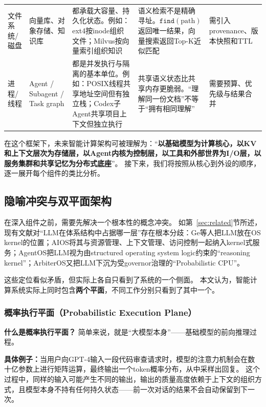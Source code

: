 \begin{table}[t]
\begin{tabularx}{\textwidth}{p{}p{}Y Y Y}
文件系统/磁盘 & 向量库、对象存储、知识库 & 都承载大容量、持久化状态。例如：ext4按inode组织文件；Milvus按向量索引组织知识\cite{lewis2020rag} & 语义检索不是精确寻址。$\texttt{find}(\text{path})$返回唯一结果，向量搜索返回Top-K近似匹配 & 需引入provenance、版本快照和TTL \\
进程/线程 & Agent / Subagent / Task graph & 都是并发执行与隔离的基本单位。例如：POSIX线程共享地址空间但有独立栈；Codex子Agent共享项目上下文但独立执行\cite{openai_codex_subagents_2026} & 共享语义状态比共享内存更脆弱。``理解同一份文档''不等于``拥有相同理解'' & 需要预算、优先级与结果合并 \\
\bottomrule
\end{tabularx}
\end{table}

在这个框架下，未来智能计算架构可被理解为：``\textbf{以基础模型为计算核心，以KV和上下文层次为存储层，以Agent内核为控制层，以工具和外部世界为I/O层，以服务集群和共享记忆为分布式底座}''。
接下来，我们将按照从核心到外设的顺序，逐一展开每个组件的类比分析。

\subsection{隐喻冲突与双平面架构}

在深入组件之前，需要先解决一个根本性的概念冲突。
如第~\ref{sec:related}节所述，现有文献对``LLM在体系结构中占据哪一层''存在根本分歧：Ge等人把LLM放在OS kernel的位置\cite{ge2023llmos}；AIOS将其与资源管理、上下文管理、访问控制一起纳入kernel式服务\cite{mei2024aios}；AgentOS把LLM视为由structured operating system logic约束的``reasoning kernel''\cite{agentos2025}；ArbiterOS又把LLM下沉为受governor治理的``Probabilistic CPU''\cite{arbiteros2025}。

这些定位看似矛盾，但实际上各自只看到了系统的一个侧面。
本文认为，智能计算系统实际上同时包含\textbf{两个平面}，不同工作分别只看到了其中一个。

\subsubsection{概率执行平面（Probabilistic Execution Plane）}

\textbf{什么是概率执行平面？}
简单来说，就是``大模型本身''——基础模型的前向推理过程。

\textbf{具体例子：}当用户向GPT-4输入一段代码审查请求时，模型的注意力机制会在数十亿参数上进行矩阵运算，最终输出一个token概率分布，从中采样出回复。
这个过程中，同样的输入可能产生不同的输出，输出的质量高度依赖于上下文的组织方式，且模型本身不持有任何持久状态——前一次对话的结果不会自动保留到下一次。

